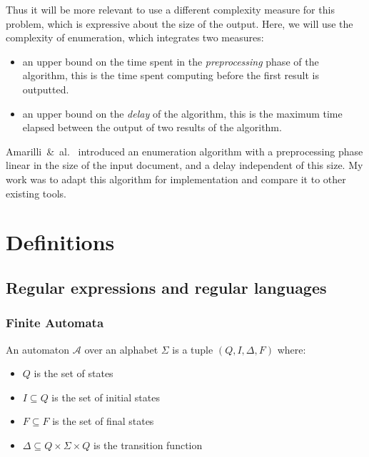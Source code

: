 \documentclass[12px]{article}
\begin{document}
    Thus it will be more relevant to use a different complexity measure for
    this problem, which is expressive about the size of the output. Here, we
    will use the complexity of enumeration, which integrates two measures:

    \begin{itemize}
      \item an upper bound on the time spent in the \textit{preprocessing}
        phase of the algorithm, this is the time spent computing before the
        first result is outputted.
      \item an upper bound on the \textit{delay} of the algorithm, this is
        the maximum time elapsed between the output of two results of the
        algorithm.
    \end{itemize}

    Amarilli~\&~al.~\cite{ICDT19} introduced an enumeration algorithm with a
    preprocessing phase linear in the size of the input document, and a delay
    independent of this size. My work was to adapt this algorithm for
    implementation and compare it to other existing tools.


  \section{Definitions}

    \subsection{Regular expressions and regular languages}

      \subsubsection{Finite Automata}

        An automaton $\mathcal{A}$ over an alphabet $\Sigma$ is a tuple $(Q, I,
        \Delta, F)$ where:
        \begin{itemize}
          \item $Q$ is the set of states
          \item $I \subseteq Q$ is the set of initial states
          \item $F \subseteq F$ is the set of final states
          \item $\Delta \subseteq Q \times \Sigma \times Q$ is the transition
            function
        \end{itemize}
\end{document}
